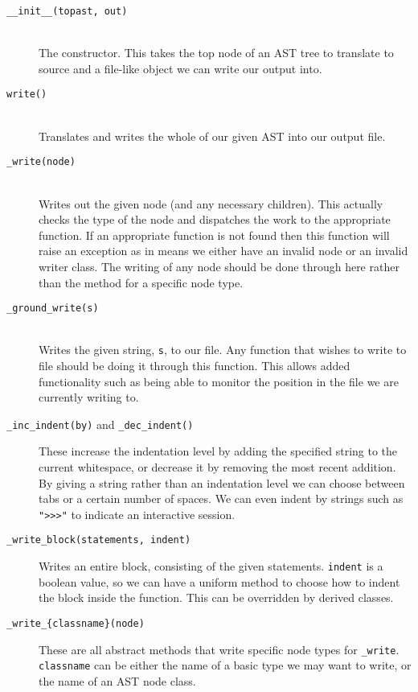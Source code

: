 \documentclass{report}
\begin{document}
\begin{description}
\item[\texttt{\_\_init\_\_(topast, out)}] \hfill \\
The constructor. This takes the top node of an AST tree to translate to source and a file-like object we can write our output into.

\item[\texttt{write()}] \hfill \\
Translates and writes the whole of our given AST into our output file.

\item[\texttt{\_write(node)}] \hfill \\
Writes out the given node (and any necessary children). This actually checks the type of the node and dispatches the work to the appropriate function.
If an appropriate function is not found then this function will raise an exception as in means we either have an invalid node or an invalid writer class.
The writing of any node should be done through here rather than the method for a specific node type.

\item[\texttt{\_ground\_write(s)}] \hfill \\
Writes the given string, \texttt{s}, to our file. Any function that wishes to write to file should be doing it through this function.
This allows added functionality such as being able to monitor the position in the file we are currently writing to.

\item[\texttt{\_inc\_indent(by)} and \texttt{\_dec\_indent()}]
These increase the indentation level by adding the specified string to the current whitespace, or decrease it by removing the most recent addition.
By giving a string rather than an indentation level we can choose between tabs or a certain number of spaces. We can even indent by strings such
as \texttt{">>>"} to indicate an interactive session.

\item[\texttt{\_write\_block(statements, indent)}]
Writes an entire block, consisting of the given statements. \texttt{indent} is a boolean value, so we can have a uniform method to choose how to
indent the block inside the function. This can be overridden by derived classes.

\item[\texttt{\_write\_\{classname\}(node)}]
These are all abstract methods that write specific node types for \texttt{\_write}. \texttt{classname} can be either the name of a basic type we
may want to write, or the name of an AST node class.

\end{description}
\end{document}
